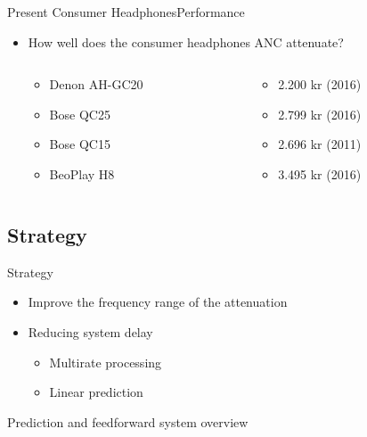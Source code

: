 \begin{frame}{Present Consumer Headphones}{Performance}
	\begin{itemize}	
	\item How well does the consumer headphones ANC attenuate?
	\begin{columns}
		\begin{column}{0.27\textwidth}
		\begin{itemize}
			\item Denon AH-GC20
			\item Bose QC25 
			\item Bose QC15 	
			\item BeoPlay H8 	
		\end{itemize}
		\end{column}
		\begin{column}{0.6\textwidth} 
		\begin{itemize}
			\item[] 2.200 kr (2016)
			\item[] 2.799 kr (2016)
			\item[] 2.696 kr (2011)
			\item[] 3.495 kr (2016)
		\end{itemize}
		\end{column}
	\end{columns}
	\end{itemize}			
	\begin{center}
		
	\end{center}	
\end{frame}

\subsection{Strategy}
\begin{frame}{Strategy}
	\begin{center}
	\begin{itemize}
		\item Improve the frequency range of the attenuation
		\item Reducing system delay
		\begin{itemize}	
		\item Multirate processing
		\item Linear prediction
		\end{itemize}				
	\end{itemize}
	\end{center}
\end{frame}

\begin{frame}{Prediction and feedforward system overview}
	\begin{center}
			
	\end{center}
\end{frame}

